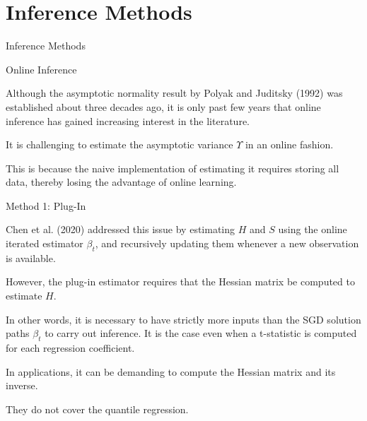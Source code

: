 \documentclass[beamer, t]{beamer}
\begin{document}
\section{Inference Methods}

\begin{frame}
   \vfill
   \centering
   \LARGE{Inference Methods}
   \vfill
\end{frame}

  

\begin{frame}{Online Inference}

Although the asymptotic normality result by Polyak and Juditsky (1992) was established about three decades ago, it is only past few years that online inference has gained increasing interest in the literature.
\bigskip

It is challenging to estimate the asymptotic variance $\Upsilon$  in an online fashion.
\bigskip


This is because
the naive implementation of estimating it requires storing all data, thereby losing the advantage of online learning.


\end{frame}



\begin{frame}{Method 1: Plug-In}


Chen et al. (2020) addressed this issue by  estimating   $H$ and $S$ using the online iterated estimator $\beta_t$, and recursively updating   them   whenever a new observation  is available.

\bigskip 
However, the plug-in estimator requires that the Hessian matrix be computed to estimate $H$.

\bigskip
In other words, it is necessary to have strictly more inputs than  the SGD solution paths $\beta_t$ to carry out inference. It is the case even when a t-statistic is computed for each regression coefficient.

\bigskip
In applications, it can be demanding to compute the Hessian matrix and its inverse. 

\bigskip
They do not cover the quantile regression.

\end{frame}
\end{document}

